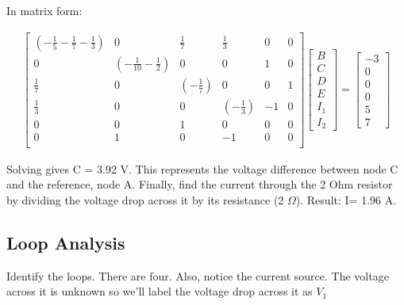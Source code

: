 In matrix form:

\begin{align*}
\left[ \begin{matrix}
(-\frac{1}{5}-\frac{1}{7}-\frac{1}{3})	&0	&\frac{1}{7}	&\frac{1}{3} &0&0\\
0	&(-\frac{1}{10}-\frac{1}{2})	&0	&0	&1&0\\
\frac{1}{7}	&0	&(-\frac{1}{7}) &0	&0	&1\\
\frac{1}{3}	&0	&0	&(-\frac{1}{3})	&-1	&0\\
0	&0	&1	&0	&0	&0\\
0	&1	&0	&-1	&0	&0\\
\end{matrix} \right]
\left[ \begin{matrix}
B\\
C\\
D\\
E\\
I_1\\
I_2
\end{matrix} \right] =
\left[ \begin{matrix}
-3\\
0\\
0\\
0\\
5\\
7
\end{matrix} \right]
\end{align*}

Solving gives C = 3.92 V. This represents the voltage difference between node C and the reference, node A. Finally, find the current through the 2 Ohm resistor by dividing the voltage drop across it by its resistance (2 $\Omega$). Result: I= 1.96 A.
\par
\subsection{Loop Analysis}
Identify the loops. There are four. Also, notice the current source. The voltage across it is unknown so we'll label the voltage drop across it as $V_1$ 

